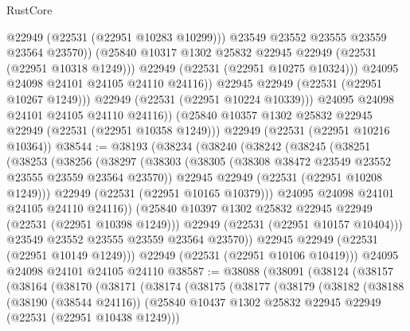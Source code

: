 \begin{lexlean}{RustCore}
\begin{coremodule}
                        @22949
                        (@22531 (@22951 @10283 @10299)))
                      @23549
                      @23552
                      @23555
                      @23559
                      @23564
                      @23570))
                  (@25840 @10317 @1302 @25832 @22945 @22949 (@22531 (@22951 @10318 @1249)))
                  @22949
                  (@22531 (@22951 @10275 @10324)))
                @24095
                @24098
                @24101
                @24105
                @24110
                @24116))
            @22945
            @22949
            (@22531 (@22951 @10267 @1249)))
          @22949
          (@22531 (@22951 @10224 @10339)))
        @24095
        @24098
        @24101
        @24105
        @24110
        @24116))
    (@25840 @10357 @1302 @25832 @22945 @22949 (@22531 (@22951 @10358 @1249)))
    @22949
    (@22531 (@22951 @10216 @10364))
@38544 := @38193
    (@38234
      (@38240
        (@38242
          (@38245
            (@38251
              (@38253
                (@38256
                  (@38297
                    (@38303
                      (@38305 (@38308 @38472 @23549 @23552 @23555 @23559 @23564 @23570))
                      @22945
                      @22949
                      (@22531 (@22951 @10208 @1249)))
                    @22949
                    (@22531 (@22951 @10165 @10379)))
                  @24095
                  @24098
                  @24101
                  @24105
                  @24110
                  @24116))
              (@25840 @10397 @1302 @25832 @22945 @22949 (@22531 (@22951 @10398 @1249)))
              @22949
              (@22531 (@22951 @10157 @10404)))
            @23549
            @23552
            @23555
            @23559
            @23564
            @23570))
        @22945
        @22949
        (@22531 (@22951 @10149 @1249)))
      @22949
      (@22531 (@22951 @10106 @10419)))
    @24095
    @24098
    @24101
    @24105
    @24110
@38587 := @38088
    (@38091
      (@38124
        (@38157
          (@38164
            (@38170
              (@38171
                (@38174
                  (@38175
                    (@38177
                      (@38179
                        (@38182
                          (@38188
                            (@38190 (@38544 @24116))
                            (@25840
                              @10437
                              @1302
                              @25832
                              @22945
                              @22949
                              (@22531 (@22951 @10438 @1249)))

\end{coremodule}
\end{lexlean}
